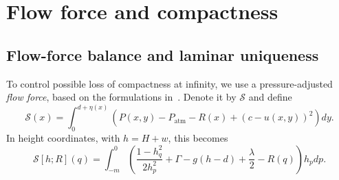 \documentclass[12pt,letterpaper]{amsart}
\numberwithin{equation}{section}
\begin{document}
		
		
		
		
		
		
		
		
		
		
		
		
		
		
		
		

	
	

	
	
	

	
	
	
	
	
	
	
	
	
	
	
	
	
	
	
	
	
	
	
	
	
	
	
	
	
	

	

	

	
	
	
	\section{{Flow force and compactness}}\label{sec:compactness}
	\subsection{{Flow-force balance and laminar uniqueness}}
	{To control possible loss of compactness at infinity, we use a pressure-adjusted \emph{flow force}, based on the formulations in~\cite{basu,bk,milesjma}. Denote it by $\mathscr S$ and define}
	\begin{equation*}
	\mathscr	S(x)=\int_0^{d+\eta(x)} (P(x,y)-P_{\mathrm{atm}}-R(x)+(c-u(x,y))^2)dy.
	\end{equation*}
	{In height coordinates, with $h=H+w$, this becomes}
	\begin{equation}\label{eq:flow-force}
	\mathscr{S}[h;R](q)=\int_{-m}^0\left(\frac{1-h_q^2}{2h_p^2}+\Gamma-g(h-d)+\frac{\lambda}{2}-R(q)\right)h_pdp.
	\end{equation}
\end{document}
